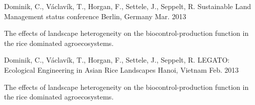 \begin{cventries}
  \cventry
    {Dominik, C., Václavík, T., Horgan, F., Settele, J., Seppelt, R.} %
    {Sustainable Land Management status conference} %
    {Berlin, Germany} %
    {Mar. 2013} %
    {
      \begin{cvitems} %
        \item {The effects of landscape heterogeneity on the biocontrol-production function in the rice dominated agroecosystems.}
      \end{cvitems}
    }
    
  \cventry
    {Dominik, C., Václavík, T., Horgan, F., Settele, J., Seppelt, R.} %
    {LEGATO: Ecological Engineering in Asian Rice Landscapes} %
    {Hanoi, Vietnam} %
    {Feb. 2013} %
    {
      \begin{cvitems} %
        \item {The effects of landscape heterogeneity on the biocontrol-production function in the rice dominated agroecosystems.}
      \end{cvitems}
    }    

\end{cventries}


